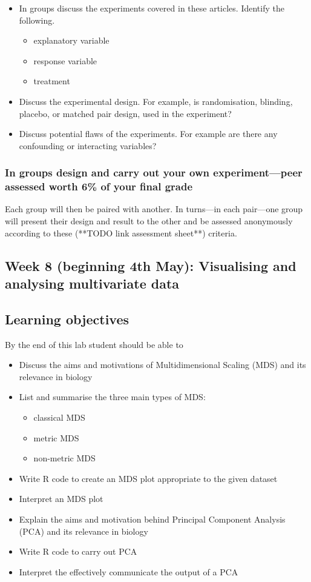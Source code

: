 \documentclass{article}
\begin{document}
\begin{itemize}
\item In groups discuss the experiments covered in these articles. Identify the following.
  \begin{itemize}
  \item explanatory variable
  \item response variable
  \item treatment 
  \end{itemize}
\item Discuss the experimental design. For example, is randomisation, blinding, placebo, or matched pair design, used in the experiment?
\item Discuss potential flaws of the experiments. For example are there any confounding or interacting variables?
\end{itemize}

\subsubsection*{In groups design and carry out your own experiment---peer assessed worth 6\% of your final grade}
 Each group will then be paired with another. In turns---in each pair---one group will present their design and result to the other and be assessed anonymously according to these (**TODO link assessment sheet**) criteria.


\newpage

\subsection*{Week 8 (beginning 4th May): Visualising and analysing multivariate data}
\subsection*{Learning objectives}
By the end of this lab student should be able to
\begin{itemize}
\item Discuss the aims and motivations of Multidimensional Scaling (MDS) and its relevance in biology
\item List and summarise the three main types of MDS:
  \begin{itemize}
  \item classical MDS
  \item metric MDS
  \item non-metric MDS
  \end{itemize}
\item Write R code to create an MDS plot appropriate to the given dataset
\item Interpret an MDS plot
\item Explain the aims and motivation behind Principal Component Analysis (PCA) and its relevance in biology 
\item Write R code to carry out PCA
  \item Interpret the effectively communicate the output of a PCA 
\end{itemize}
\end{document}
